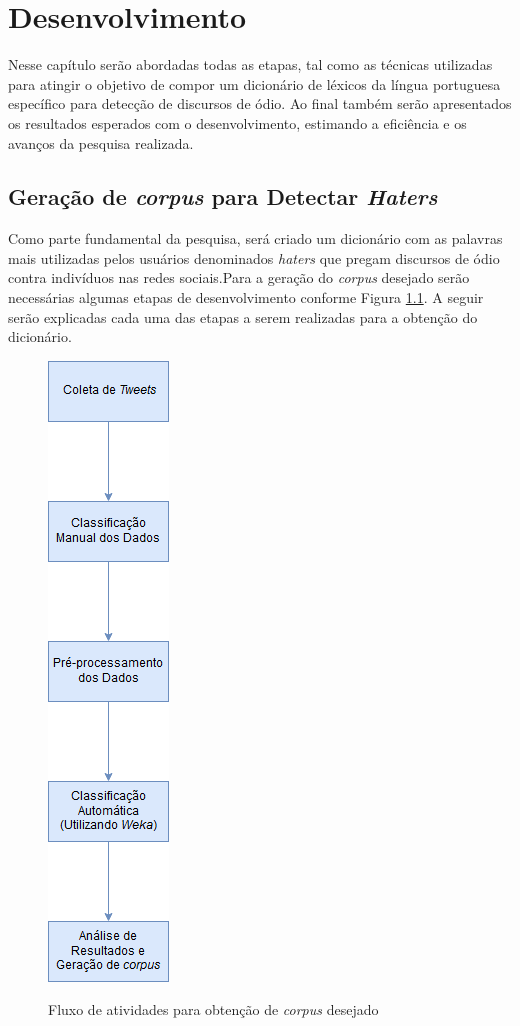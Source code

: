 \chapter{Desenvolvimento}
\label{cap:Desenvolvimento}
Nesse capítulo serão abordadas todas as etapas, tal como as técnicas utilizadas para atingir o objetivo de compor um dicionário de léxicos da língua portuguesa específico para detecção de discursos de ódio. Ao final também serão apresentados os resultados esperados com o desenvolvimento, estimando a eficiência e os avanços da pesquisa realizada. 

\section{Geração de \textit{corpus} para Detectar \textit{Haters}}
Como parte fundamental da pesquisa, será criado um dicionário com as palavras mais utilizadas pelos usuários denominados \textit{haters} que pregam discursos de ódio contra indivíduos nas redes sociais.Para a geração do \textit{corpus} desejado serão necessárias algumas etapas de desenvolvimento conforme Figura \ref{fig:fluxodesenvolvimento}. A seguir serão explicadas cada uma das etapas a serem realizadas para a obtenção do dicionário.

\begin{figure}[!h]
\centering 
\caption{Fluxo de atividades para obtenção de \textit{corpus} desejado}
\includegraphics[scale=0.5]{imagens/fluxodesenvolvimento.png}
\label{fig:fluxodesenvolvimento}
\end{figure}

